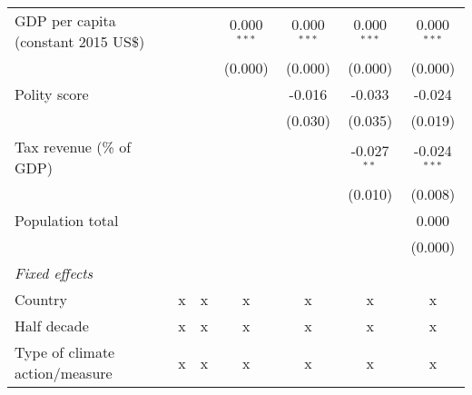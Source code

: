 \begin{tabular}{lcccccc}
   GDP per capita (constant 2015 US\$)                                                                 &         &                & 0.000$^{***}$  & 0.000$^{***}$  & 0.000$^{***}$  & 0.000$^{***}$\\   
                                                                                                       &         &                & (0.000)        & (0.000)        & (0.000)        & (0.000)\\   
   Polity score                                                                                        &         &                &                & -0.016         & -0.033         & -0.024\\   
                                                                                                       &         &                &                & (0.030)        & (0.035)        & (0.019)\\   
   Tax revenue (\% of GDP)                                                                             &         &                &                &                & -0.027$^{**}$  & -0.024$^{***}$\\   
                                                                                                       &         &                &                &                & (0.010)        & (0.008)\\   
   Population total                                                                                    &         &                &                &                &                & 0.000\\   
                                                                                                       &         &                &                &                &                & (0.000)\\   
   \emph{Fixed effects}\\
   Country                                                                                             & x       & x              & x              & x              & x              & x\\  
   Half decade                                                                                         & x       & x              & x              & x              & x              & x\\  
   Type of climate action/measure                                                                      & x       & x              & x              & x              & x              & x\\  

\end{tabular}
